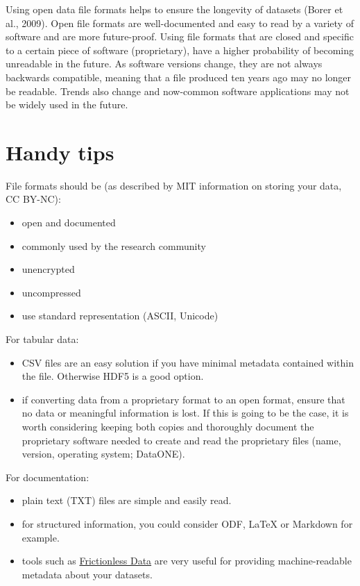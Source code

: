 \documentclass[12pt,a4paper,oneside]{report}
\providecommand{\tightlist}{%
  \setlength{\itemsep}{0pt}\setlength{\parskip}{0pt}}
\begin{document}
Using open data file formats helps to ensure the longevity of datasets
(Borer et al., 2009). Open file formats are well-documented and easy to
read by a variety of software and are more future-proof. Using file
formats that are closed and specific to a certain piece of software
(proprietary), have a higher probability of becoming unreadable in the
future. As software versions change, they are not always backwards
compatible, meaning that a file produced ten years ago may no longer be
readable. Trends also change and now-common software applications may
not be widely used in the future.

\hypertarget{handy-tips-2}{%
\section{Handy tips}\label{handy-tips-2}}

File formats should be (as described by MIT information on storing your
data, CC BY-NC):

\begin{itemize}
\tightlist
\item
  open and documented
\item
  commonly used by the research community
\item
  unencrypted
\item
  uncompressed
\item
  use standard representation (ASCII, Unicode)
\end{itemize}

For tabular data:

\begin{itemize}
\tightlist
\item
  CSV files are an easy solution if you have minimal metadata contained
  within the file. Otherwise HDF5 is a good option.
\item
  if converting data from a proprietary format to an open format, ensure
  that no data or meaningful information is lost. If this is going to be
  the case, it is worth considering keeping both copies and thoroughly
  document the proprietary software needed to create and read the
  proprietary files (name, version, operating system; DataONE).
\end{itemize}

For documentation:

\begin{itemize}
\tightlist
\item
  plain text (TXT) files are simple and easily read.
\item
  for structured information, you could consider ODF, LaTeX or Markdown
  for example.
\item
  tools such as \href{https://frictionlessdata.io/}{Frictionless Data}
  are very useful for providing machine-readable metadata about your
  datasets.
\end{itemize}
\end{document}
